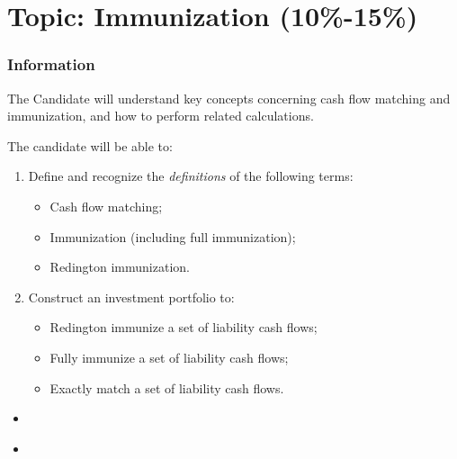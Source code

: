 \chapter[Topic: Immunization]{Topic: Immunization (10\%-15\%)}

\subsection{Information}

\begin{distributions}[Objective]
The Candidate will understand key concepts concerning cash flow matching and immunization, and how to perform related calculations.
\end{distributions}

\begin{outcomes}
The candidate will be able to:
\begin{enumerate}[label = \alph*)]
	\item	Define and recognize the \textit{definitions} of the following terms:
		\begin{itemize}[leftmargin = *]
		\item	Cash flow matching;
		\item	Immunization (including full immunization);
		\item	Redington immunization.
		\end{itemize}
	\item	Construct an investment portfolio to:
		\begin{itemize}[leftmargin = *]
		\item	Redington immunize a set of liability cash flows;
		\item	Fully immunize a set of liability cash flows;
		\item	Exactly match a set of liability cash flows.
		\end{itemize}
\end{enumerate}
\end{outcomes}

\begin{ASM_chapter}
\begin{itemize}
	\item	{}
\end{itemize}
\end{ASM_chapter}

\begin{YTB_vids}
\begin{itemize}
	\item	
\end{itemize}
\end{YTB_vids}

